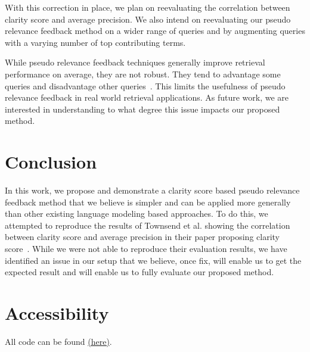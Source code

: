 \documentclass[format=sigconf, screen=true, review=false]{acmart}
\begin{document}
With this correction in place, we plan on reevaluating the correlation between clarity score and average precision.
We also intend on reevaluating our pseudo relevance feedback method on a wider range of queries and by augmenting queries with a varying number of top contributing terms.




While pseudo relevance feedback techniques generally improve retrieval performance on average, they are not robust.
They tend to advantage some queries and disadvantage other queries~\cite{collins2009reducing,harman2004nrrc}.
This limits the usefulness of pseudo relevance feedback in real world retrieval applications.
As future work, we are interested in understanding to what degree this issue impacts our proposed method.

\section{Conclusion}
In this work, we propose and demonstrate a clarity score based pseudo relevance feedback method that we believe is simpler and can be applied more generally than other existing language modeling based approaches.
To do this, we attempted to reproduce the results of Townsend et al. showing the correlation between clarity score and average precision in their paper proposing clarity score~\cite{10.1145/564376.564429}.
While we were not able to reproduce their evaluation results, we have identified an issue in our setup that we believe, once fix, will enable us to get the expected result and will enable us to fully evaluate our proposed method.


\section{Accessibility}
All code can be found \href{https://github.com/bryantcurto/UW-CS848-ClarityScore}{(here)}.



\end{document}
